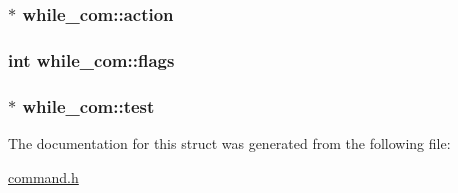 \subsubsection[{\texorpdfstring{action}{action}}]{$\ast$ while\+\_\+com\+::action}\hypertarget{structwhile__com_a8eaeeadd6e86e0a0a76144bf29a60b4d}{}\label{structwhile__com_a8eaeeadd6e86e0a0a76144bf29a60b4d}
\subsubsection[{\texorpdfstring{flags}{flags}}]{\setlength{\rightskip}{0pt plus 5cm}int while\+\_\+com\+::flags}\hypertarget{structwhile__com_aeee869c9eb263491c5454c3c8c6b098a}{}\label{structwhile__com_aeee869c9eb263491c5454c3c8c6b098a}
\subsubsection[{\texorpdfstring{test}{test}}]{$\ast$ while\+\_\+com\+::test}\hypertarget{structwhile__com_ab695c3ea48e16db8f9e7589fb56366f8}{}\label{structwhile__com_ab695c3ea48e16db8f9e7589fb56366f8}


The documentation for this struct was generated from the following file\+:\begin{DoxyCompactItemize}
\item 
\hyperlink{command_8h}{command.\+h}\end{DoxyCompactItemize}
